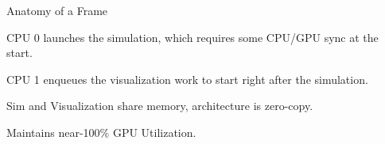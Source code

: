 \begin{frame}{Anatomy of a Frame}
    \vfill\null
    \begin{wideitemize}
        \item CPU 0 launches the simulation, which requires some CPU/GPU sync at the start.
        \item CPU 1 enqueues the visualization work to start right after the simulation.
        \item Sim and Visualization share memory, architecture is zero-copy.
        \item Maintains near-100\% GPU Utilization.
    \end{wideitemize}
\end{frame}

